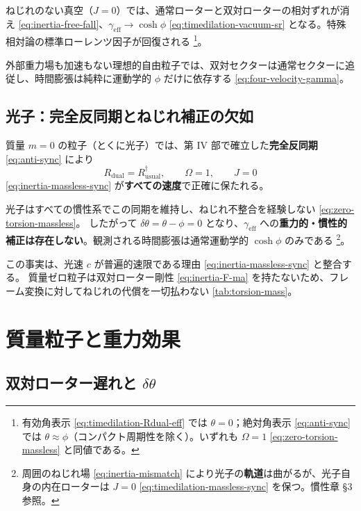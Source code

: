 \documentclass[dvipdfmx,a4paper,oneside]{jsbook}
\numberwithin{equation}{chapter}
\begin{document}
ねじれのない真空（\(J = 0\)）では、通常ローターと双対ローターの相対ずれが消え \eqref{eq:inertia-free-fall}、\(\gamma_{\mathrm{eff}} \to \cosh\phi\) \eqref{eq:timedilation-vacuum-sr} となる。特殊相対論の標準ローレンツ因子が回復される \footnote{有効角表示 \eqref{eq:timedilation-Rdual-eff} では \(\theta = 0\)；絶対角表示 \eqref{eq:anti-sync} では \(\theta \approx \phi\)（コンパクト周期性を除く）。いずれも \(\Omega = 1\) \eqref{eq:zero-torsion-massless} と同値である。}。

外部重力場も加速もない理想的自由粒子では、双対セクターは通常セクターに追従し、時間膨張は純粋に運動学的 \(\phi\) だけに依存する \eqref{eq:four-velocity-gamma}。

\subsection{光子：完全反同期とねじれ補正の欠如}

質量 \(m = 0\) の粒子（とくに光子）では、第 IV 部で確立した\textbf{完全反同期} \eqref{eq:anti-sync} により
\begin{equation}
  R_{\mathrm{dual}} = R_{\mathrm{usual}}^\dagger,
  \qquad
  \Omega = 1,
  \qquad
  J = 0
  \label{eq:timedilation-massless-sync}
\end{equation}
\eqref{eq:inertia-massless-sync} が\textbf{すべての速度}で正確に保たれる。

光子はすべての慣性系でこの同期を維持し、ねじれ不整合を経験しない \eqref{eq:zero-torsion-massless}。
したがって \(\delta\theta = \theta - \phi = 0\) となり、\(\gamma_{\mathrm{eff}}\) への\textbf{重力的・慣性的補正は存在しない}。観測される時間膨張は通常運動学的 \(\cosh\phi\) のみである \footnote{周囲のねじれ場 \eqref{eq:inertia-mismatch} により光子の\textbf{軌道}は曲がるが、光子自身の内在ローターは \(J = 0\) \eqref{eq:timedilation-massless-sync} を保つ。慣性章 §3 参照。}。

この事実は、光速 \(c\) が普遍的速限である理由 \eqref{eq:inertia-massless-sync} と整合する。
質量ゼロ粒子は双対ローター剛性 \eqref{eq:inertia-F-ma} を持たないため、フレーム変換に対してねじれの代償を一切払わない \eqref{tab:torsion-mass}。

\section{質量粒子と重力効果}

\subsection{双対ローター遅れと \(\delta\theta\)}
\end{document}
